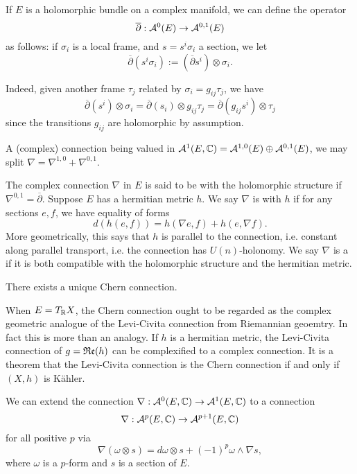 If $E$ is a holomorphic bundle on a complex manifold, we can define the operator
%
\[
\overline\partial:\mathcal{A}^0(E)\to \mathcal{A}^{0,1}(E)
\]
%
as follows: if $\sigma_i$ is a local frame, and $s=s^i \sigma_i$ a section, we let
\begin{equation}
	\overline\partial(s^i\sigma_i):=(\overline\partial s^i)\otimes \sigma_i.\label{eq: dbar bundle}
\end{equation}

Indeed, given another frame $\tau_j$ related by $\sigma_i=g_{ij}\tau_j$, we have
\[
\overline\partial (s^i)\otimes \sigma_i=\overline \partial(s_i)\otimes g_{ij}\tau_j=\overline\partial(g_{ij}s^i)\otimes \tau_j
\]
since the transitions $g_{ij}$ are holomorphic by assumption.

A (complex) connection being valued in $\mathcal{A}^1(E,\mathbb C)=\mathcal{A}^{1,0}(E)\oplus\mathcal{A}^{0,1}(E)$, we may split $\nabla=\nabla^{1,0}+\nabla^{0,1}$.
\begin{definition}
	The complex connection $\nabla$ in $E$ is said to be  with the holomorphic structure if $\nabla^{0,1}=\overline\partial$. Suppose $E$ has a hermitian metric $h$. We say $\nabla$ is  with $h$ if for any sections $e,f$, we have equality of forms
	\[d(h(e,f))=h(\nabla e,f)+h(e,\nabla f).\]
	More geometrically, this says that $h$ is parallel to the connection, i.e. constant along parallel transport, i.e. the connection has $U(n)$-holonomy. We say $\nabla$ is a  if it is both compatible with the holomorphic structure and the hermitian metric.
\end{definition} 

\begin{theorem}[Chern]
	There exists a unique Chern connection.
\end{theorem}

When $E=T_\mathbb R X$, the Chern connection ought to be regarded as the complex geometric analogue of the Levi-Civita connection from Riemannian geoemtry. In fact this is more than an analogy. If $h$ is a hermitian metric, the Levi-Civita connection of $g=\mathfrak{R}\mathfrak{e}(h)$ can be complexified to a complex connection. It is a theorem that the Levi-Civita connection is the Chern connection if and only if $(X,h)$ is Kähler.

We can extend the connection $\nabla:\mathcal{A}^0(E,\mathbb C)\to \mathcal{A}^1(E,\mathbb C)$ to a connection
\[
\nabla:\mathcal{A}^p(E,\mathbb C)\to \mathcal{A}^{p+1}(E,\mathbb C)
\]
for all positive $p$ via
\[
\nabla(\omega\otimes s)=d\omega\otimes s+(-1)^p\omega\wedge\nabla s,
\]
where $\omega$ is a $p$-form and $s$ is a section of $E$.

